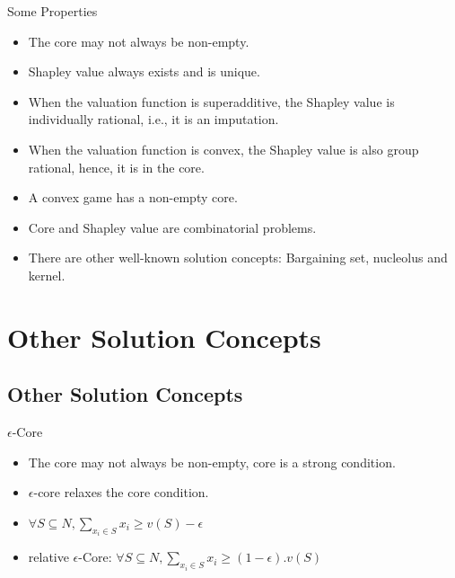 \documentclass{beamer}
\begin{document}
\begin{frame}{Some Properties}
    \begin{itemize}
        \item The core may not always be non-empty.
        \item Shapley value always exists and is unique.
        \item When the valuation function is {\color{blue}superadditive}, the Shapley value is {\color{blue}individually rational}, i.e., it is an imputation.
        \item When the valuation function is {\color{blue}convex}, the Shapley value is also group rational, hence, it is in the {\color{blue}core}.
        \item A convex game has a non-empty core.
        \item Core and Shapley value are combinatorial problems.
        \item There are other well-known solution concepts: Bargaining set, nucleolus and kernel.
    \end{itemize}
\end{frame}

\section{Other Solution Concepts}
\subsection{Other Solution Concepts}
\begin{frame}{$\epsilon$-Core}
    \begin{itemize}
        \item The core may not always be non-empty, core is a strong condition.
        \item $\epsilon$-core relaxes the core condition.
        \item $\forall S \subseteq N, \sum_{x_i \in S} x_i \geq v(S) - \epsilon$
        \item relative $\epsilon$-Core: $\forall S \subseteq N, \sum_{x_i \in S} x_i \geq (1-\epsilon).v(S)$
    \end{itemize}
\end{frame}
\end{document}
